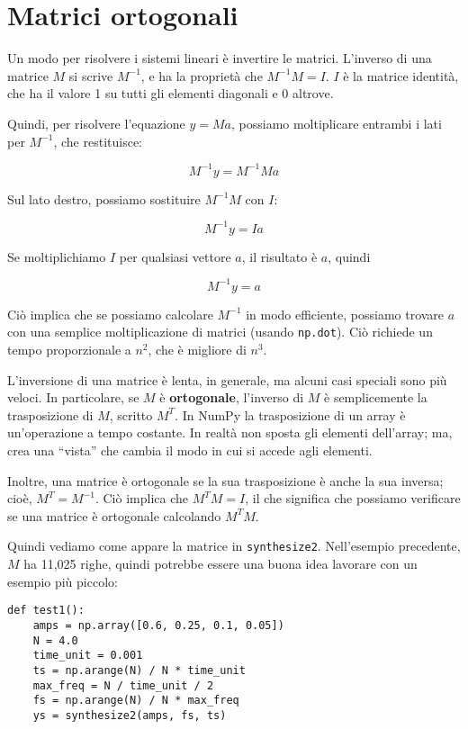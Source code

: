 \documentclass[12pt,a4paper]{book}
\begin{document}
\section{Matrici ortogonali} 

Un modo per risolvere i sistemi lineari è invertire le matrici. L'inverso di una matrice $M$ si scrive $M^{-1}$, e ha la proprietà che $M^{-1}M = I$. $I$ è la matrice identità, che ha il valore 1 su tutti gli elementi diagonali e 0 altrove.

Quindi, per risolvere l'equazione $y = Ma$, possiamo moltiplicare entrambi i lati per $M^{-1}$, che restituisce:

%
\[ M^{-1}y = M^{-1} M a \] 

%
Sul lato destro, possiamo sostituire $M^{-1}M$ con $I$:

%
\[ M^{-1}y = I a \] 

%
Se moltiplichiamo $I$ per qualsiasi vettore $a$, il risultato è $a$, quindi

%
\[ M^{-1}y = a \] 

%
Ciò implica che se possiamo calcolare $M^{-1}$ in modo efficiente, possiamo trovare $a$ con una semplice moltiplicazione di matrici (usando {\tt np.dot}). Ciò richiede un tempo proporzionale a $n^2$, che è migliore di $n^3$.

L'inversione di una matrice è lenta, in generale, ma alcuni casi speciali sono più veloci. In particolare, se $M$ è {\bf ortogonale}, l'inverso di $M$ è semplicemente la trasposizione di $M$, scritto $M^T$. In NumPy la trasposizione di un array è un'operazione a tempo costante. In realtà non sposta gli elementi dell'array; ma, crea una ``vista'' che cambia il modo in cui si accede agli elementi.

Inoltre, una matrice è ortogonale se la sua trasposizione è anche la sua inversa; cioè, $M^T = M^{-1}$. Ciò implica che $M^TM = I$, il che significa che possiamo verificare se una matrice è ortogonale calcolando $M^TM$.

Quindi vediamo come appare la matrice in {\tt synthesize2}. Nell'esempio precedente, $M$ ha 11,025 righe, quindi potrebbe essere una buona idea lavorare con un esempio più piccolo:

\begin{verbatim} 
def test1():
    amps = np.array([0.6, 0.25, 0.1, 0.05])
    N = 4.0
    time_unit = 0.001
    ts = np.arange(N) / N * time_unit
    max_freq = N / time_unit / 2
    fs = np.arange(N) / N * max_freq
    ys = synthesize2(amps, fs, ts)
 \end{verbatim} 
\end{document}
